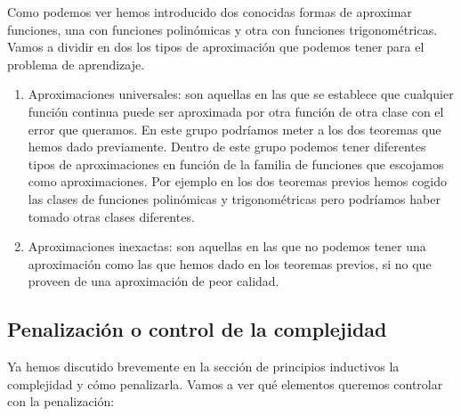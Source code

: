 Como podemos ver hemos introducido dos conocidas formas de aproximar funciones, una con funciones polinómicas y otra con funciones trigonométricas. Vamos a dividir en dos los tipos de  aproximación que podemos tener para el problema de aprendizaje.

\begin{enumerate}
	\item Aproximaciones universales: son aquellas en las que se establece que cualquier función continua puede ser aproximada por otra función de otra clase con el error que queramos. En este grupo podríamos meter a los dos teoremas que hemos dado previamente. Dentro de este grupo podemos tener diferentes tipos de aproximaciones en función de la familia de funciones que escojamos como aproximaciones. Por ejemplo en los dos teoremas previos hemos cogido las clases de funciones polinómicas y trigonométricas pero podríamos haber tomado otras clases diferentes.
	\item Aproximaciones inexactas: son aquellas en las que no podemos tener una aproximación como las que hemos dado en los teoremas previos, si no que proveen de una aproximación de peor calidad.
\end{enumerate}

\subsection{Penalización o control de la complejidad}

Ya hemos discutido brevemente en la sección de principios inductivos la complejidad y cómo penalizarla. Vamos a ver qué elementos queremos controlar con la penalización:

